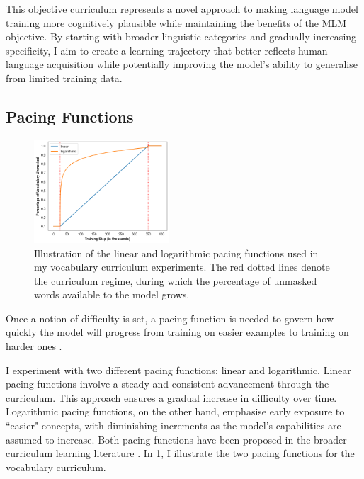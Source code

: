 This objective curriculum represents a novel approach to making language model training more cognitively plausible while maintaining the benefits of the MLM objective. By starting with broader linguistic categories and gradually increasing specificity, I aim to create a learning trajectory that better reflects human language acquisition while potentially improving the model's ability to generalise from limited training data.

\subsection{Pacing Functions} 
\label{subsec:pacing-functions}

\begin{figure}
    \vspace{-1em}
    \centering
    \includegraphics[width=0.45\textwidth]{chapters/climb/figures/pacing_fns.png}
    \caption{Illustration of the linear and logarithmic pacing functions used in my vocabulary curriculum experiments. The red dotted lines denote the curriculum regime, during which the percentage of unmasked words available to the model grows.}
    \label{fig:pacing_fn}
    \vspace{-1em}
\end{figure}

Once a notion of difficulty is set, a pacing function is needed to govern how quickly the model will progress from training on easier examples to training on harder ones \citep{wu2021when}.

I experiment with two different pacing functions: linear and logarithmic. Linear pacing functions involve a steady and consistent advancement through the curriculum. This approach ensures a gradual increase in difficulty over time. Logarithmic pacing functions, on the other hand, emphasise early exposure to ``easier" concepts, with diminishing increments as the model's capabilities are assumed to increase. Both pacing functions have been proposed in the broader curriculum learning literature \citep{bai2022better, li2021curriculum, wu2021when}. In \cref{fig:pacing_fn}, I illustrate the two pacing functions for the vocabulary curriculum.


